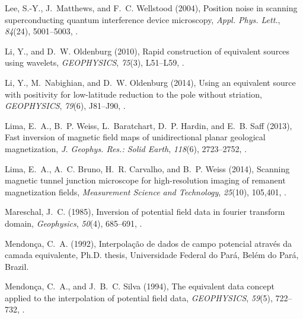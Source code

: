 \documentclass[galley,gc]{agutex}
\begin{document}
\begin{article}
\begin{thebibliography}{40}
Lee, S.-Y., J.~Matthews, and F.~C. Wellstood (2004), Position noise in scanning
  superconducting quantum interference device microscopy, \textit{Appl. Phys.
  Lett.}, \textit{84}(24), 5001--5003, .

Li, Y., and D.~W. Oldenburg (2010), Rapid construction of equivalent sources
  using wavelets, \textit{GEOPHYSICS}, \textit{75}(3), L51--L59,
  .

Li, Y., M.~Nabighian, and D.~W. Oldenburg (2014), Using an equivalent source
  with positivity for low-latitude reduction to the pole without striation,
  \textit{GEOPHYSICS}, \textit{79}(6), J81--J90, .

Lima, E.~A., B.~P. Weiss, L.~Baratchart, D.~P. Hardin, and E.~B. Saff (2013),
  Fast inversion of magnetic field maps of unidirectional planar geological
  magnetization, \textit{J. Geophys. Res.: Solid Earth}, \textit{118}(6),
  2723--2752, .

Lima, E.~A., A.~C. Bruno, H.~R. Carvalho, and B.~P. Weiss (2014), Scanning
  magnetic tunnel junction microscope for high-resolution imaging of remanent
  magnetization fields, \textit{Measurement Science and Technology},
  \textit{25}(10), 105,401, .

Mareschal, J.~C. (1985), Inversion of potential field data in fourier transform
  domain, \textit{Geophysics}, \textit{50}(4), 685--691,
  .

Mendon\c{c}a, C.~A. (1992), Interpola\c{c}\~{a}o de dados de campo potencial
  atrav\'{e}s da camada equivalente, Ph.D. thesis, Universidade Federal do
  Par\'{a}, Bel\'{e}m do Par\'{a}, Brazil.

Mendon\c{c}a, C.~A., and J.~B.~C. Silva (1994), The equivalent data concept
  applied to the interpolation of potential field data, \textit{GEOPHYSICS},
  \textit{59}(5), 722--732, .


\end{thebibliography}
\end{article}
\end{document}
